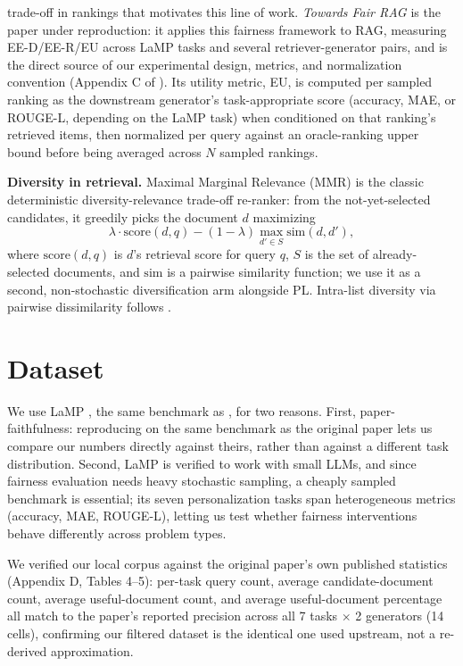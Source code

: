 \documentclass[10pt,twocolumn]{article}
\begin{document}
trade-off in rankings that motivates this line of work. \emph{Towards Fair RAG}
\cite{eunkim2025fairrag} is the paper under reproduction: it applies this fairness
framework to RAG, measuring EE-D/EE-R/EU across LaMP tasks and several
retriever-generator pairs, and is the direct source of our experimental design,
metrics, and normalization convention (Appendix C of \cite{eunkim2025fairrag}). Its
utility metric, EU, is computed per sampled ranking as the downstream generator's
task-appropriate score (accuracy, MAE, or ROUGE-L, depending on the LaMP task) when
conditioned on that ranking's retrieved items, then normalized per query against an
oracle-ranking upper bound before being averaged across $N$ sampled rankings.

\textbf{Diversity in retrieval.} Maximal Marginal Relevance (MMR)
\cite{carbonell1998use} is the classic deterministic diversity-relevance trade-off
re-ranker: from the not-yet-selected candidates, it greedily picks the document $d$
maximizing
\begin{equation}
\lambda \cdot \mathrm{score}(d, q) - (1-\lambda) \max_{d' \in S} \mathrm{sim}(d, d'),
\label{eq:mmr}
\end{equation}
where $\mathrm{score}(d,q)$ is $d$'s retrieval score for query
$q$, $S$ is the set of already-selected documents, and $\mathrm{sim}$ is a pairwise
similarity function; we use it as a second, non-stochastic diversification arm
alongside PL. Intra-list diversity via pairwise dissimilarity follows
\cite{smyth2001similarity}.

\section{Dataset}
\label{sec:data}

We use LaMP \cite{salemi2023lamp}, the same benchmark as \cite{eunkim2025fairrag},
for two reasons. First, paper-faithfulness: reproducing on the same benchmark as the
original paper lets us compare our numbers directly against theirs, rather than
against a different task distribution. Second, LaMP is verified to work with small
LLMs, and since fairness evaluation needs heavy stochastic sampling, a cheaply
sampled benchmark is essential; its seven personalization tasks span heterogeneous
metrics (accuracy, MAE, ROUGE-L), letting us test whether fairness interventions
behave differently across problem types.

We verified our local corpus against the original paper's own published statistics
(Appendix D, Tables 4--5): per-task query count, average candidate-document count,
average useful-document count, and average useful-document percentage all match
to the paper's reported precision across all 7 tasks $\times$ 2 generators (14
cells), confirming our filtered dataset is the identical one used upstream, not a
re-derived approximation.
\end{document}
